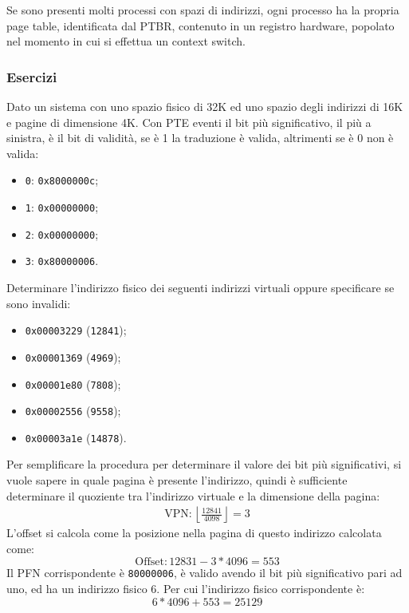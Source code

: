 \documentclass{article}
\numberwithin{equation}{subsection}
\begin{document}
Se sono presenti molti processi con spazi di indirizzi, ogni processo ha la propria page table, identificata dal PTBR, contenuto in un registro hardware, popolato nel 
momento in cui si effettua un context switch. 

\subsubsection{Esercizi}

Dato un sistema con uno spazio fisico di 32K ed uno spazio degli indirizzi di 16K e pagine di dimensione 4K. Con PTE eventi il bit più significativo, il più a sinistra, 
è il bit di validità, se è 1 la traduzione è valida, altrimenti se è 0 non è valida:
\begin{itemize}
    \item \verb|0|: \verb|0x8000000c|;
    \item \verb|1|: \verb|0x00000000|;
    \item \verb|2|: \verb|0x00000000|;
    \item \verb|3|: \verb|0x80000006|.
\end{itemize}

Determinare l'indirizzo fisico dei seguenti indirizzi virtuali oppure specificare se sono invalidi:
\begin{itemize}
    \item \verb|0x00003229| (\verb|12841|);
    \item \verb|0x00001369| (\verb|4969|);
    \item \verb|0x00001e80| (\verb|7808|);
    \item \verb|0x00002556| (\verb|9558|);
    \item \verb|0x00003a1e| (\verb|14878|).
\end{itemize}

Per semplificare la procedura per determinare il valore dei bit più significativi, si vuole sapere in quale pagina è presente l'indirizzo, quindi è sufficiente determinare 
il quoziente tra l'indirizzo virtuale e la dimensione della pagina:
\begin{gather*}
    \mathrm{VPN}:\left\lfloor\displaystyle\frac{12841}{4098}\right\rfloor=3
\end{gather*}
L'offset si calcola come la posizione nella pagina di questo indirizzo calcolata come:
\begin{equation*}
    \mathrm{Offset}:12831-3*4096=553
\end{equation*}
Il PFN corrispondente è \verb|80000006|, è valido avendo il bit più significativo pari ad uno, ed ha un indirizzo fisico 6. Per cui l'indirizzo fisico corrispondente è:
\begin{equation}
    6*4096+553=25129
\end{equation}
\end{document}
